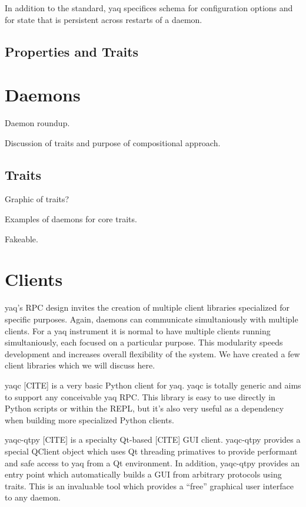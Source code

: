 \documentclass{article}
\begin{document}
In addition to the standard, yaq specifices schema for configuration options and for state that is persistent across restarts of a daemon.

\subsection{Properties and Traits}



\section{Daemons}

Daemon roundup.

Discussion of traits and purpose of compositional approach.

\subsection{Traits}

Graphic of traits?

Examples of daemons for core traits.

Fakeable.

\section{Clients}

yaq's RPC design invites the creation of multiple client libraries specialized for specific purposes.
Again, daemons can communicate simultaniously with multiple clients.
For a yaq instrument it is normal to have multiple clients running simultaniously, each focused on a particular purpose.
This modularity speeds development and increases overall flexibility of the system.
We have created a few client libraries which we will discuss here.

yaqc [CITE] is a very basic Python client for yaq.
yaqc is totally generic and aims to support any conceivable yaq RPC.
This library is easy to use directly in Python scripts or within the REPL, but it's also very useful as a dependency when building more specialized Python clients.

yaqc-qtpy [CITE] is a specialty Qt-based [CITE] GUI client.
yaqc-qtpy provides a special QClient object which uses Qt threading primatives to provide performant and safe access to yaq from a Qt environment.
In addition, yaqc-qtpy provides an entry point which automatically builds a GUI from arbitrary protocols using traits.
This is an invaluable tool which provides a ``free'' graphical user interface to any daemon.
\end{document}
